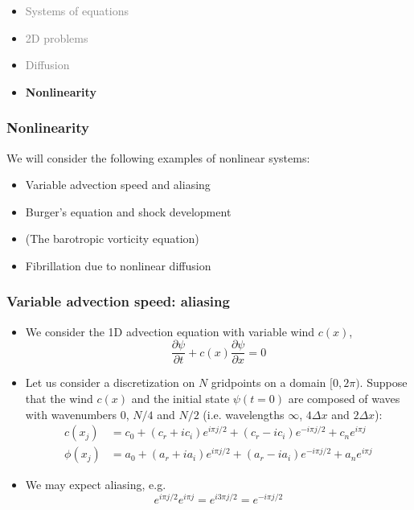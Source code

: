 \documentclass[aspectratio=149,9pt]{beamer}
\begin{document}
%
%
\begin{frame}
	\begin{itemize}
		\item \textcolor{gray}{Systems of equations}
		\item \textcolor{gray}{2D problems}
		\item \textcolor{gray}{Diffusion}
		\item {\bfseries Nonlinearity}
	\end{itemize}
\end{frame}
%
%
\begin{frame}
	\frametitle{Nonlinearity}
	We will consider the following examples of nonlinear systems:\vspace*{4ex}
	\begin{itemize}
		\item Variable advection speed and aliasing\vspace*{2ex}
		\item Burger's equation and shock development\vspace*{2ex}
		\item (The barotropic vorticity equation)\vspace*{2ex}
		\item Fibrillation due to nonlinear diffusion
	\end{itemize}
\end{frame}
%
%
\begin{frame}
	\frametitle{Variable advection speed: aliasing}
	\begin{itemize}
		\item We consider the 1D advection equation with variable wind $c(x)$,
			\begin{equation*}
				\frac{\partial \psi}{\partial t} + c(x) \frac{\partial \psi}{\partial x} = 0
			\end{equation*}
		\item Let us consider a discretization on $N$ gridpoints on a domain $[0,2\pi)$. Suppose that the wind $c(x)$ and the initial state $\psi(t=0)$ are composed of waves with wavenumbers $0$, $N/4$ and $N/2$ (i.e. wavelengths $\infty$, $4\Delta x$ and $2\Delta x$):
			\begin{align*}
				c(x_j) &= c_0 + (c_r+ic_i) e^{i \pi j/2} + (c_r-ic_i) e^{-i \pi j/2} + c_n e^{i \pi j} \\
				\phi(x_j) &= a_0 + (a_r+ia_i) e^{i \pi j/2} + (a_r-ia_i) e^{-i \pi j/2} + a_n e^{i \pi j}
			\end{align*}
		\item We may expect aliasing, e.g.
			\begin{equation*}
				e^{i \pi j /2} e^{i \pi j} = e^{i 3 \pi j /2} = e^{- i \pi j/2}
			\end{equation*}
	\end{itemize}
\end{frame}
\end{document}
